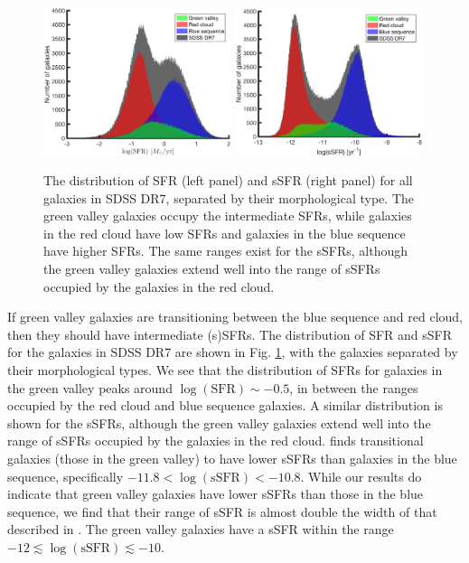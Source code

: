 \begin{figure}
    \includegraphics[width=0.49\textwidth]{Images/GV/SFR_hist}
    \includegraphics[width=0.49\textwidth]{Images/GV/sSFR_hist}
    \caption[(s)SFR distribution by morphological type]{The distribution of SFR 
    (left panel) and sSFR (right panel) for all galaxies in SDSS DR7, separated 
    by their morphological type.  The green valley galaxies occupy the 
    intermediate SFRs, while galaxies in the red cloud have low SFRs and 
    galaxies in the blue sequence have higher SFRs.  The same ranges exist for 
    the sSFRs, although the green valley galaxies extend well into the range of 
    sSFRs occupied by the galaxies in the red cloud.}
    \label{fig:SFR_hist}
\end{figure}

If green valley galaxies are transitioning between the blue sequence and red 
cloud, then they should have intermediate (s)SFRs.  The distribution of SFR and 
sSFR for the galaxies in SDSS DR7 are shown in Fig. \ref{fig:SFR_hist}, with the 
galaxies separated by their morphological types.  We see that the distribution 
of SFRs for galaxies in the green valley peaks around 
$\log(\text{SFR}) \sim -0.5$, in between the ranges occupied by the red cloud 
and blue sequence galaxies.  A similar distribution is shown for the sSFRs, 
although the green valley galaxies extend well into the range of sSFRs occupied 
by the galaxies in the red cloud.  \cite{Salim14a} finds transitional galaxies 
(those in the green valley) to have lower sSFRs than galaxies in the blue 
sequence, specifically $-11.8 < \log(\text{sSFR}) < -10.8$.  While our results 
do indicate that green valley galaxies have lower sSFRs than those in the blue 
sequence, we find that their range of sSFR is almost double the width of that 
described in \cite{Salim14a}.  The green valley galaxies have a sSFR within the 
range $-12 \lesssim \log(\text{sSFR}) \lesssim -10$.


